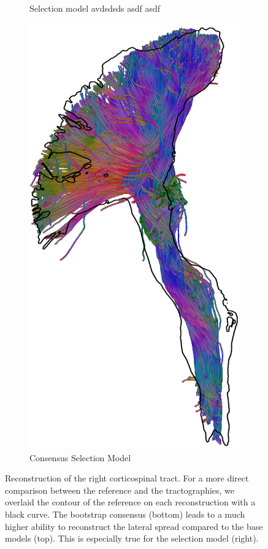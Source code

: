 \begin{figure}[t]
\begin{minipage}{0.19\linewidth}
\begin{subfigure}[b]{\linewidth}
		\caption{Selection model {\color{white} avdsdsds asdf asdf}}
	\end{subfigure}
	\begin{subfigure}[b]{\linewidth}
		\includegraphics[width=\linewidth]{cst-sel-bootstrap-c}
		\caption{Consensus Selection Model}
\end{subfigure} 
	\end{minipage}
\caption{Reconstruction of the right corticospinal tract. For a more direct comparison
	between the reference and the tractographies, we overlaid the contour of the reference on each reconstruction with a black
	curve. The bootstrap consensus (bottom) leads to a much higher ability
to reconstruct the lateral spread compared to the base models (top). This is
especially true for the selection model (right).  }
	\label{fig:CST}
\end{figure}

